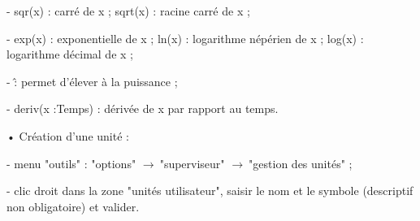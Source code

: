 \documentclass[a4paper,10pt]{article}
\def\r{$\rightarrow\ $}
\def\esp{\vspace{0.2cm}}
\begin{document}
- sqr(x) : carré de x ; sqrt(x) : racine carré de x ;

- exp(x) : exponentielle de x ; ln(x) : logarithme népérien de x ; log(x) : logarithme décimal de x ;

- \^ : permet d’élever à la puissance ;

- deriv(x :Temps) : dérivée de x par rapport au temps.

\esp
\noindent
• Création d'une unité : 
\vspace{0.1cm}

- menu "outils" : "options" \r "superviseur" \r "gestion des unités" ;
\vspace{0.1cm}

- clic droit dans la zone "unités utilisateur", saisir le nom et le symbole (descriptif non obligatoire) et valider.
\end{document}
